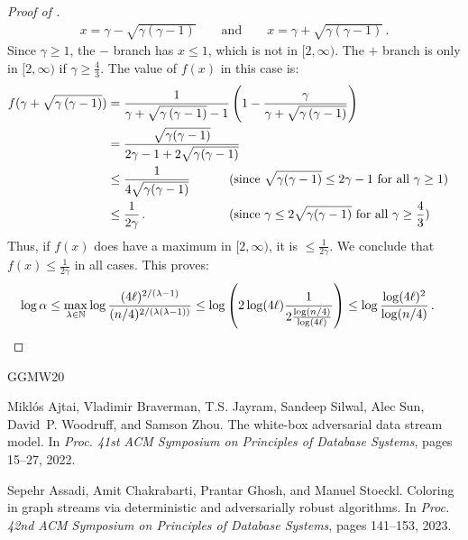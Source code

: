 \documentclass[10pt,a4paper]{article}
\theoremstyle{definition}
\theoremstyle{remark}
\newcommand{\NN}{\mathbb{N}}
\newcommand{\rl}{\mathbf{\ell}}             %
\begin{document}
\begin{itemize}
\begin{itemize}
\begin{proof}[Proof of ]
  \begin{align*}
    x = \gamma-\sqrt{\gamma\left(\gamma-1\right)} \qquad \text{and} \qquad  x = \gamma+\sqrt{\gamma\left(\gamma-1\right)} \,.
  \end{align*}
  Since $\gamma \ge 1$, the $-$ branch has $x \le 1$, which is not in $[2,\infty)$. The $+$ branch is only in $[2,\infty)$ if $\gamma \ge \frac{4}{3}$. The value of $f(x)$ in this case is:
  \begin{align*}
    f(\gamma+\sqrt{\gamma\left(\gamma-1\right)}) &= \frac{1}{\gamma+\sqrt{\gamma\left(\gamma-1\right)} - 1} \left(1 - \frac{\gamma}{\gamma+\sqrt{\gamma\left(\gamma-1\right)}} \right) \\
      &= \frac{\sqrt{\gamma(\gamma-1)}}{2 \gamma - 1 + 2 \sqrt{\gamma(\gamma-1)}} \\
      &\le \frac{1}{4 \sqrt{\gamma(\gamma-1)}}  &&\hspace{-4cm}\text{(since $\sqrt{\gamma(\gamma-1)} \le 2 \gamma - 1$ for all $\gamma \ge 1$)}
      \\
      &\le \frac{1}{2 \gamma} \,. &&\hspace{-4cm}\text{(since $\gamma \le 2 \sqrt{\gamma(\gamma-1)}$ for all $\gamma \ge \frac{4}{3}$)}
  \end{align*}
  Thus, if $f(x)$ does have a maximum in $[2,\infty)$, it is $\le \frac{1}{2\gamma}$. We conclude that $f(x) \le \frac{1}{2\gamma}$ in all cases. This proves:
  \begin{align*}
    \log \alpha \le \max_{\lambda \in \NN} \log \frac{(4 \rl)^{2/(\lambda-1)}}{(n/4)^{2/(\lambda(\lambda-1))}} 
      &\le \log\left(2 \log(4 \ell) \frac{1}{2 \frac{\log(n/4)}{\log(4\rl)}} \right) \le \log \frac{  \log(4 \ell)^2}{\log(n/4)} \,. \qedhere
  \end{align*}
\end{proof}

\newcommand{\etalchar}[1]{$^{#1}$}
\begin{thebibliography}{GGMW20}

\bibitem[ABJ{\etalchar{+}}22]{AjtaiBJSSWZ22}
Mikl\'os Ajtai, Vladimir Braverman, T.S. Jayram, Sandeep Silwal, Alec Sun,
  David~P. Woodruff, and Samson Zhou.
\newblock The white-box adversarial data stream model.
\newblock In {\em Proc. 41st ACM Symposium on Principles of Database Systems},
  pages 15--27, 2022.

Sepehr Assadi, Amit Chakrabarti, Prantar Ghosh, and Manuel Stoeckl.
\newblock Coloring in graph streams via deterministic and adversarially robust
  algorithms.
\newblock In {\em Proc. 42nd ACM Symposium on Principles of Database Systems},
  pages 141--153, 2023.


\end{thebibliography}
\end{itemize}
\end{itemize}
\end{document}
